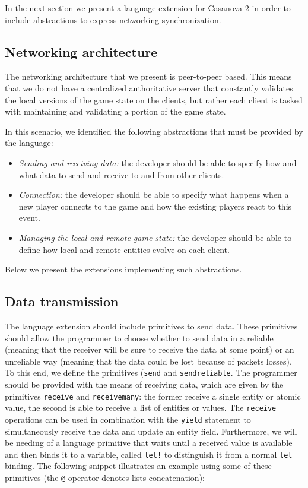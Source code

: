 In the next section we present a language extension for Casanova 2 in order to include abstractions to express networking synchronization.

\subsection{Networking architecture}
The networking architecture that we present is peer-to-peer based. This means that we do not have a centralized authoritative server that constantly validates the local versions of the game state on the clients, but rather each client is tasked with maintaining and validating a portion of the game state.

In this scenario, we identified the following abstractions that must be provided by the language:

\begin{itemize}
	\item \textit{Sending and receiving data:} the developer should be able to specify how and what data to send and receive to and from other clients.
	\item \textit{Connection:} the developer should be able to specify what happens when a new player connects to the game and how the existing players react to this event.
	\item \textit{Managing the local and remote game state:} the developer should be able to define how local and remote entities evolve on each client.
\end{itemize}

Below we present the extensions implementing such abstractions.

\subsection{Data transmission}

The language extension should include primitives to send data. These primitives should allow the programmer to choose whether to send data in a reliable (meaning that the receiver will be sure to receive the data at some point) or an unreliable way (meaning that the data could be lost because of packets losses). To this end, we define the primitives (\texttt{send} and \texttt{send\textunderscore reliable}. The programmer should be provided with the means of receiving data, which are given by the primitives \texttt{receive} and \texttt{receive\textunderscore many}: the former receive a single entity or atomic value, the second is able to receive a list of entities or values. The \texttt{receive} operations can be used in combination with the \texttt{yield} statement to simultaneously receive the data and update an entity field. Furthermore, we will be needing of a language primitive that waits until a received value is available and then binds it to a variable, called \texttt{let!} to distinguish it from a normal \texttt{let} binding. The following snippet illustrates an example using some of these primitives (the \texttt{@} operator denotes lists concatenation):

